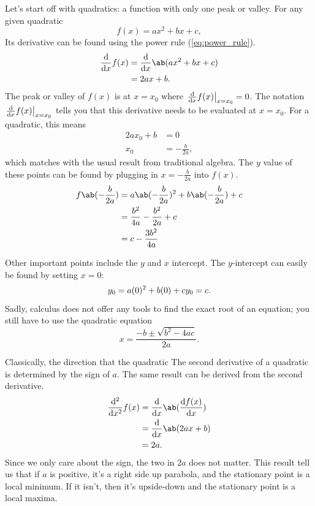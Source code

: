Let's start off with quadratics: a function with only one peak or valley. For any given quadratic
\begin{equation}
  f(x) = ax^2 + bx + c,
\end{equation}
Its derivative can be found using the power rule (\cref{eq:power_rule}).
\begin{align}
  \odv*{f(x)}{x} & = \odv*{\ab(ax^2 + bx + c)}{x} \\
                 & = 2ax + b.
\end{align}
The peak or valley of $f(x)$ is at $x = x_0$ where $\odv*{f(x)}{x}_{x = x_0} = 0$. The notation $\odv*{f(x)}{x}_{x = x_0}$ tells you that this derivative needs to be evaluated at $x = x_0$. For a quadratic, this means
\begin{align}
  2ax_0 + b & = 0              \\
  x_0       & = -\frac{b}{2a},
\end{align}
which matches with the usual result from traditional algebra. The $y$ value of these points can be found by plugging in $x = -\frac{b}{2a}$ into $f(x)$.
\begin{align}
  f\ab(-\frac{b}{2a}) & = a\ab(-\frac{b}{2a})^2 + b\ab(-\frac{b}{2a}) + c  \\
                      & = \frac{b^2}{4a} - \frac{b^2}{2a} + c              \\
                      & = c - \frac{3b^2}{4a} \label{eq:parabola_y_vertex}
\end{align}

Other important points include the $y$ and $x$ intercept. The $y$-intercept can easily be found by setting $x = 0$:
\begin{equation}
  y_0 = a(0)^2 + b(0) + c \\
  y_0 = c.
\end{equation}
Sadly, calculus does not offer any tools to find the exact root of an equation; you still have to use the quadratic equation
\begin{equation}
  x = \frac{- b \pm \sqrt{b^2 - 4ac}}{2a}.
\end{equation}

Classically, the direction that the quadratic The second derivative of a quadratic is determined by the sign of $a$. The same result can be derived from the second derivative.
\begin{align}
  \odv*[ord = 2]{f(x)}{x} & = \odv*{\ab(\odv{f(x)}{x})}{x} \\
                          & = \odv*{\ab(2ax + b)}{x}       \\
                          & = 2a.
\end{align}
Since we only care about the sign, the two in $2a$ does not matter. This result tell us that if $a$ is positive, it's a right side up parabola, and the stationary point is a local minimum. If it isn't, then it's upside-down and the stationary point is a local maxima.

